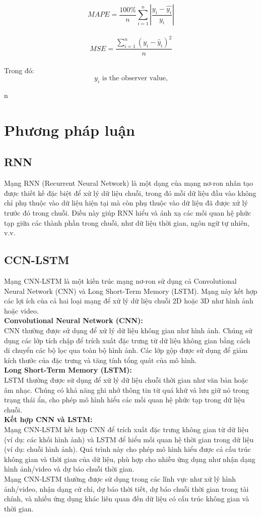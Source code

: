 \documentclass[conference]{IEEEtran}
\begin{document}
	\[MAPE=\frac{100\%}{n}  \sum_{i=1}^{n} |\frac{y_i-\hat{y_i}}{y_i} | \]\\
	
	\[MSE = \frac{\sum_{i=1}^{n} (y_i - \hat{y}_i)^2}{n}\]\\
	
	Trong đó:\\
	$$y_i \text{ is the observer value,}
	
	$$ 
	
	$$n 
	
	
	\section{\textbf{Phương pháp luận}}
	\subsection{RNN}
	Mạng RNN (Recurrent Neural Network) là một dạng của mạng nơ-ron nhân tạo được thiết kế đặc biệt để xử lý dữ liệu chuỗi, trong đó mỗi dữ liệu đầu vào không chỉ phụ thuộc vào dữ liệu hiện tại mà còn phụ thuộc vào dữ liệu đã được xử lý trước đó trong chuỗi. Điều này giúp RNN hiểu và ánh xạ các mối quan hệ phức tạp giữa các thành phần trong chuỗi, như dữ liệu thời gian, ngôn ngữ tự nhiên, v.v.
	\subsection{CCN-LSTM}
	Mạng CNN-LSTM là một kiến trúc mạng nơ-ron sử dụng cả Convolutional Neural Network (CNN) và Long Short-Term Memory (LSTM). Mạng này kết hợp các lợi ích của cả hai loại mạng để xử lý dữ liệu chuỗi 2D hoặc 3D như hình ảnh hoặc video.\\
	\textbf{Convolutional Neural Network (CNN):}\\
	CNN thường được sử dụng để xử lý dữ liệu không gian như hình ảnh. Chúng sử dụng các lớp tích chập để trích xuất đặc trưng từ dữ liệu không gian bằng cách di chuyển các bộ lọc qua toàn bộ hình ảnh. Các lớp gộp được sử dụng để giảm kích thước của đặc trưng và tăng tính tổng quát của mô hình.\\
	\textbf{Long Short-Term Memory (LSTM):}\\
	LSTM thường được sử dụng để xử lý dữ liệu chuỗi thời gian như văn bản hoặc âm nhạc. Chúng có khả năng ghi nhớ thông tin từ quá khứ và lưu giữ nó trong trạng thái ẩn, cho phép mô hình hiểu các mối quan hệ phức tạp trong dữ liệu chuỗi.\\
	\textbf{Kết hợp CNN và LSTM:}\\
	Mạng CNN-LSTM kết hợp CNN để trích xuất đặc trưng không gian từ dữ liệu (ví dụ: các khối hình ảnh) và LSTM để hiểu mối quan hệ thời gian trong dữ liệu (ví dụ: chuỗi hình ảnh). Quá trình này cho phép mô hình hiểu được cả cấu trúc không gian và thời gian của dữ liệu, phù hợp cho nhiều ứng dụng như nhận dạng hình ảnh/video và dự báo chuỗi thời gian.\\
	Mạng CNN-LSTM thường được sử dụng trong các lĩnh vực như xử lý hình ảnh/video, nhận dạng cử chỉ, dự báo thời tiết, dự báo chuỗi thời gian trong tài chính, và nhiều ứng dụng khác liên quan đến dữ liệu có cấu trúc không gian và thời gian.
\end{document}

